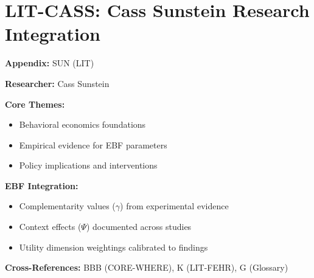 %
%

\chapter{LIT-CASS: Cass Sunstein Research Integration}
\label{app:sun}

\begin{abstract}
This appendix integrates the research contributions of Cass Sunstein into the
Evidence-Based Framework. It documents key papers, core findings, and their
integration with EBF dimensions including complementarity parameters ($\gamma$),
context factors ($\Psi$), and utility dimensions.
\end{abstract}

\begin{tcolorbox}[colback=blue!5!white, colframe=blue!75!black,
    title=Quick Reference: Cass Sunstein Research]

\textbf{Appendix:} SUN (LIT)

\textbf{Researcher:} Cass Sunstein

\textbf{Core Themes:}
\begin{itemize}[nosep]
\item Behavioral economics foundations
\item Empirical evidence for EBF parameters
\item Policy implications and interventions
\end{itemize}

\textbf{EBF Integration:}
\begin{itemize}[nosep]
\item Complementarity values ($\gamma$) from experimental evidence
\item Context effects ($\Psi$) documented across studies
\item Utility dimension weightings calibrated to findings
\end{itemize}

\textbf{Cross-References:} BBB (CORE-WHERE), K (LIT-FEHR), G (Glossary)
\end{tcolorbox}

